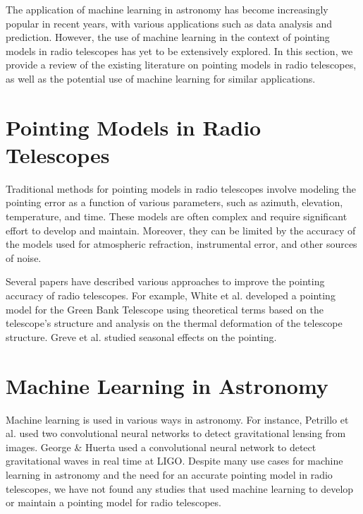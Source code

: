 The application of machine learning in astronomy has become increasingly popular in recent years, with various applications such as data analysis and prediction.
However, the use of machine learning in the context of pointing models in radio telescopes has yet to be extensively explored.
In this section, we provide a review of the existing literature on pointing models in radio telescopes, as well as the potential use of machine learning for similar applications.

\section{Pointing Models in Radio Telescopes}
Traditional methods for pointing models in radio telescopes involve modeling the pointing error as a function of various parameters, such as azimuth, elevation, temperature, and time.
These models are often complex and require significant effort to develop and maintain.
Moreover, they can be limited by the accuracy of the models used for atmospheric refraction, instrumental error, and other sources of noise.

Several papers have described various approaches to improve the pointing accuracy of radio telescopes.
For example, White et al. \cite{whitegreen2022} developed a pointing model for the Green Bank Telescope using theoretical terms based on the telescope's structure and analysis on the thermal deformation of the telescope structure.
Greve et al. \cite{greve1996pointing} studied seasonal effects on the pointing.

\section{Machine Learning in Astronomy}
Machine learning is used in various ways in astronomy.
For instance, Petrillo et al. \cite{mlastgravlens} used two convolutional neural networks to detect gravitational lensing from images.
George \& Huerta \cite{mlastgravitationalwaves} used a convolutional neural network to detect gravitational waves in real time at LIGO.
Despite many use cases for machine learning in astronomy and the need for an accurate pointing model in radio telescopes,
we have not found any studies that used machine learning to develop or maintain a pointing model for radio telescopes.

